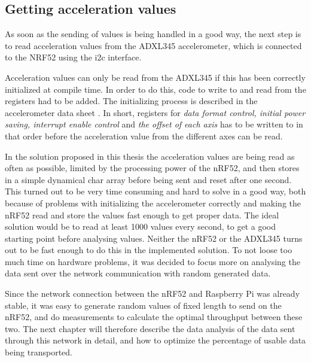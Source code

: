 

\subsection{Getting acceleration values}

As soon as the sending of values is being handled in a good way, the next step is to read acceleration values from the ADXL345 accelerometer, which is connected to the NRF52 using the \gls{i2c} interface. 

Acceleration values can only be read from the ADXL345 if this has been correctly initialized at compile time. In order to do this, code to write to and read from the registers had to be added. The initializing process is described in the accelerometer data sheet \cite{adxlDataSheet}. In short, registers for \textit{data format control, initial power saving, interrupt enable control} and \textit{the offset of each axis} has to be written to in that order before the acceleration value from the different axes can be read.  

In the solution proposed in this thesis the acceleration values are being read as often as possible, limited by the processing power of the nRF52, and then stores in a simple dynamical char array before being sent and reset after one second. This turned out to be very time consuming and hard to solve in a good way, both because of problems with initializing the accelerometer correctly and making the nRF52 read and store the values fast enough to get proper data. The ideal solution would be to read at least 1000 values every second, to get a good starting point before analysing values. Neither the nRF52 or the ADXL345 turns out to be fast enough to do this in the implemented solution.  To not loose too much time on hardware problems, it was decided to focus more on analysing the data sent over the network communication with random generated data. 

Since the network connection between the nRF52 and Raspberry Pi was already stable, it was easy to generate random values of fixed length to send on the nRF52, and do measurements to calculate the optimal throughput between these two. The next chapter will therefore describe the data analysis of the data sent through this network in detail, and how to optimize the percentage of usable data being transported.  

